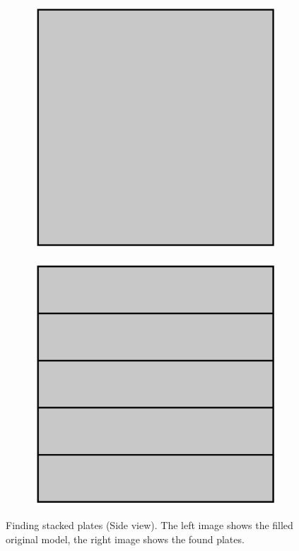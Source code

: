 \documentclass[../ClassicThesis.tex]{subfiles}
\begin{document}
\begin{figure}
    \centering
    \begin{subfigure}[t]{0.4\textwidth}
      \centering
      \includegraphics[width=\textwidth]{Images/plates_stackedplates_1.png}
    \end{subfigure}
    \begin{subfigure}[t]{0.4\textwidth}
      \centering
      \includegraphics[width=\textwidth]{Images/plates_stackedplates_2.png}
    \end{subfigure}
    \caption{Finding stacked plates (Side view). The left image shows the filled original model, the right image shows the found plates.}
    \label{fig:extplates}
\end{figure}
\end{document}
